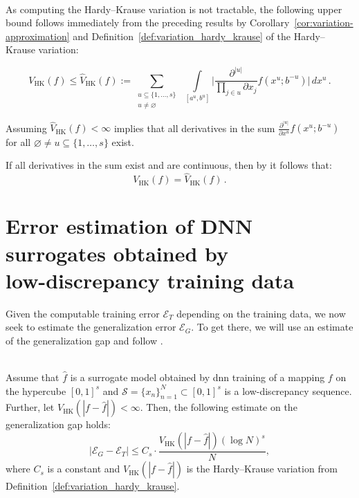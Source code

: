 \begin{remark} \ \\
    As computing the Hardy--Krause variation is not tractable, the following
    upper bound follows immediately from the preceding results by
    Corollary~\ref{cor:variation-approximation} and
    Definition~\ref{def:variation_hardy_krause} of the Hardy--Krause variation:

    \begin{equation}
        \label{eq:variation_hardy_krause_bound}
        V_{\mathrm{HK}}(f) \leq \widehat{V}_{\mathrm{HK}}(f) := 
        \sum\limits_{\substack{u\subseteq \{1,\dots,s\} \\ u \neq \varnothing}} 
        \,\, \int\limits_{[a^u,b^u]} \bigg|\frac{\partial^{|u|}}{\prod_{j\in u}\partial x_j}
        f(x^u;b^{-u}) \bigg| \,dx^u\,.
    \end{equation}
    
    Assuming $\widehat{V}_{\mathrm{HK}}(f) < \infty$ implies that all derivatives in the
    sum $\frac{\partial^{|u|}}{\partial x^u} f(x^u;b^{-u})$ for all
    $\varnothing\neq u \subseteq \{1,\ldots,s\}$ exist.

    If all derivatives in the sum exist and are continuous, then by
    \cite[Section 9]{owen2005multidimensional} it follows that:
    \begin{equation*}
        V_{\mathrm{HK}}(f) = \widehat{V}_{\mathrm{HK}}(f) \,.
    \end{equation*}
    \label{rem:variation-approximation}
\end{remark}


\section{Error estimation of DNN surrogates obtained by \\ low-discrepancy training data}

Given the computable training error $\mathcal{E}_T$ depending on the training
data, we now seek to estimate the generalization error $\mathcal{E}_G$. To get
there, we will use an estimate of the generalization gap and follow
\cite{mishra2021enhancing}.

\begin{theorem} \ \\
    Assume that $\hat{f}$ is a surrogate model obtained by \ac{dnn} training of
    a mapping $f$ on the hypercube $[0,1]^s$ and
    $\mathcal{S}=\{x_n\}_{n=1}^N\subset [0,1]^s$ is a low-discrepancy sequence.
    Further, let $V_\mathrm{HK}(|f-\hat{f}|) < \infty$. Then, the following
    estimate on the generalization gap holds:
    \begin{equation*}
        |\mathcal{E}_G - \mathcal{E}_T| \leq C_s \cdot \frac{V_{\mathrm{HK}}(|f-\hat{f}|)(\log N)^s}{N},
    \end{equation*}
    where $C_s$ is a constant and $V_{\mathrm{HK}}(|f-\hat{f}|)$ is the
    Hardy--Krause variation from Definition~\ref{def:variation_hardy_krause}.
    \label{thm:generalization_gap}
\end{theorem}

